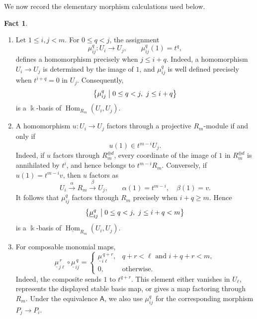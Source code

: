 \documentclass[a4paper,11pt,reqno]{amsart}
\theoremstyle{definition}
\newtheorem{fact}[fact]{Fact}
\theoremstyle{plain}
\numberwithin{equation}{section}
\newcommand{\Hom}{\operatorname{Hom}}
\newcommand{\kk}{\Bbbk}
\begin{document}
We now record the elementary morphism calculations used below.
\begin{fact}
\label{fact:a3a-cyclic-homs}
\begin{enumerate}[label=\textup{(\arabic*)},leftmargin=2.1em]
\item Let \(1\le i,j<m\).  For \(0\le q<j\), the assignment
\[
 \mu_{ij}^q:U_i\longrightarrow U_j,
 \qquad
 \mu_{ij}^q(1)=t^q,
\]
defines a homomorphism precisely when \(j\le i+q\).  Indeed, a
homomorphism \(U_i\to U_j\) is determined by the image of \(1\), and
\(\mu_{ij}^q\) is well defined precisely when
\(t^{i+q}=0\) in \(U_j\).  Consequently,
\[
 \bigl\{\mu_{ij}^q\bigm|0\le q<j,\ j\le i+q\bigr\}
\]
is a \(\kk\)-basis of \(\Hom_{R_m}(U_i,U_j)\).

\item A homomorphism \(u:U_i\to U_j\) factors through a projective
\(R_m\)-module if and only if
\[
 u(1)\in t^{m-i}U_j.
\]
Indeed, if \(u\) factors through \(R_m^{\oplus d}\), every coordinate of
the image of \(1\) in \(R_m^{\oplus d}\) is annihilated by \(t^i\), and hence belongs to
\(t^{m-i}R_m\).  Conversely, if \(u(1)=t^{m-i}v\), then \(u\) factors as
\[
 U_i\xrightarrow{\alpha}R_m\xrightarrow{\beta}U_j,
 \qquad
 \alpha(1)=t^{m-i},\quad\beta(1)=v.
\]
It follows that \(\mu_{ij}^q\) factors through \(R_m\) precisely when
\(i+q\ge m\).  Hence
\[
 \bigl\{\underline\mu_{ij}^q\bigm|
 0\le q<j,\ j\le i+q<m\bigr\}
\]
is a \(\kk\)-basis of
\(\underline{\Hom}_{R_m}(U_i,U_j)\).

\item For composable monomial maps,
\[
 \underline\mu_{j\ell}^{\,r}\circ\underline\mu_{ij}^{\,q}
 =
 \begin{cases}
  \underline\mu_{i\ell}^{\,q+r},
   &q+r<\ell\text{ and }i+q+r<m,\\
  0,&\text{otherwise}.
 \end{cases}
\]
Indeed, the composite sends \(1\) to \(t^{q+r}\).  This element either
vanishes in \(U_\ell\), represents the displayed stable basis map, or
gives a map factoring through \(R_m\).  Under the equivalence
\(\mathsf A\), we also use \(\mu_{ij}^q\) for the corresponding morphism
\(P_j\to P_i\).
\end{enumerate}
\end{fact}
\end{document}
